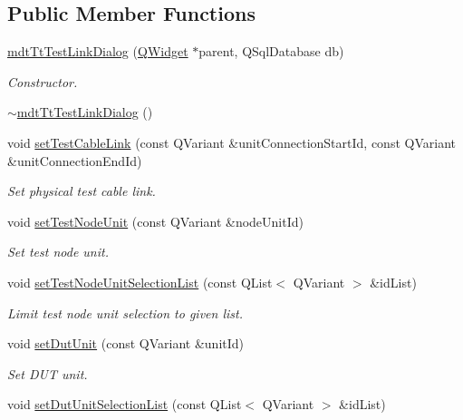 \subsection*{Public Member Functions}
\begin{DoxyCompactItemize}
\item 
\hyperlink{classmdt_tt_test_link_dialog_ac65efc1af939c5059176651d65d3c7ae}{mdt\-Tt\-Test\-Link\-Dialog} (\hyperlink{class_q_widget}{Q\-Widget} $\ast$parent, Q\-Sql\-Database db)
\begin{DoxyCompactList}\small\item\em Constructor. \end{DoxyCompactList}\item 
\hyperlink{classmdt_tt_test_link_dialog_a5732e2c5680256dd468540ae47172fbe}{$\sim$mdt\-Tt\-Test\-Link\-Dialog} ()
\item 
void \hyperlink{classmdt_tt_test_link_dialog_aeb588d5930d26eb1bd45dc0fdb505b6b}{set\-Test\-Cable\-Link} (const Q\-Variant \&unit\-Connection\-Start\-Id, const Q\-Variant \&unit\-Connection\-End\-Id)
\begin{DoxyCompactList}\small\item\em Set physical test cable link. \end{DoxyCompactList}\item 
void \hyperlink{classmdt_tt_test_link_dialog_a0816b61e02e5b82699bdbc2fdedb098f}{set\-Test\-Node\-Unit} (const Q\-Variant \&node\-Unit\-Id)
\begin{DoxyCompactList}\small\item\em Set test node unit. \end{DoxyCompactList}\item 
void \hyperlink{classmdt_tt_test_link_dialog_a05d0bcebecccd2bcc59aa1d8e1d04e05}{set\-Test\-Node\-Unit\-Selection\-List} (const Q\-List$<$ Q\-Variant $>$ \&id\-List)
\begin{DoxyCompactList}\small\item\em Limit test node unit selection to given list. \end{DoxyCompactList}\item 
void \hyperlink{classmdt_tt_test_link_dialog_a0a67dbfcdac8800ef091fc040539b148}{set\-Dut\-Unit} (const Q\-Variant \&unit\-Id)
\begin{DoxyCompactList}\small\item\em Set D\-U\-T unit. \end{DoxyCompactList}\item 
void \hyperlink{classmdt_tt_test_link_dialog_a02daf0a705e224f518a6ba67ffbe1df4}{set\-Dut\-Unit\-Selection\-List} (const Q\-List$<$ Q\-Variant $>$ \&id\-List)

\end{DoxyCompactItemize}
